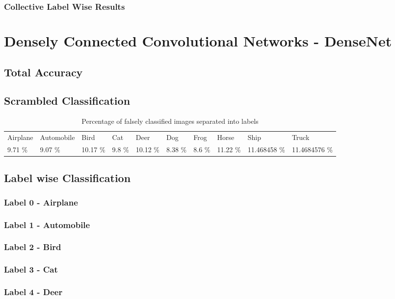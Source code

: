 \subsubsection{Collective Label Wise Results}

\section{Densely Connected Convolutional Networks - DenseNet}

\subsection{Total Accuracy}
\subsection{Scrambled Classification}

\begin{table}[]
	\centering
	\caption{Percentage of falsely classified images separated into labels }
	\label{table:falseclas}
	\begin{tabular}{llllllllll}
		Airplane & Automobile & Bird     & Cat    & Deer     & Dog     & Frog   & Horse    & Ship         & Truck         \\
		9.71 \%  & 9.07 \%    & 10.17 \% & 9.8 \% & 10.12 \% & 8.38 \% & 8.6 \% & 11.22 \% & 11.468458 \% & 11.4684576 \%
	\end{tabular}
\end{table}
\FloatBarrier
\subsection{Label wise Classification}
\subsubsection{Label 0 - Airplane}
\subsubsection{Label 1 - Automobile}
\subsubsection{Label 2 - Bird}
\subsubsection{Label 3 - Cat}
\subsubsection{Label 4 - Deer}
